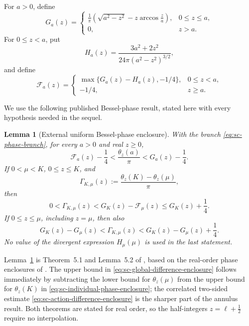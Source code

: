 \documentclass[11pt]{article}
\numberwithin{equation}{section}
\newtheorem{lemma}[theorem]{Lemma}
\theoremstyle{definition}
\theoremstyle{remark}
\begin{document}
For \(a>0\), define
\begin{equation}
  G_a(z)=
  \begin{cases}
  \displaystyle\frac1\pi\left(\sqrt{a^2-z^2}
  -z\arccos\frac za\right),&0\le z\le a,\\[1mm]
  0,&z>a.
  \end{cases}
  \label{eq:sc-model-action}
\end{equation}
For \(0\le z<a\), put
\[
  H_a(z)=\frac{3a^2+2z^2}{24\pi(a^2-z^2)^{3/2}},
\]
and define
\begin{equation}
  \mathcal F_a(z)=
  \begin{cases}
  \max\{G_a(z)-H_a(z),-1/4\},&0\le z<a,\\
  -1/4,&z\ge a.
  \end{cases}
  \label{eq:sc-auxiliary-F}
\end{equation}

We use the following published Bessel-phase result, stated here with every
hypothesis needed in the sequel.

\begin{lemma}[External uniform Bessel-phase enclosure]
\label{lem:sc-external-phase}
With the branch \eqref{eq:sc-phase-branch}, for every \(a>0\) and real
\(z\ge0\),
\begin{equation}
  \mathcal F_a(z)-\frac14
  <\frac{\theta_z(a)}\pi
  <G_a(z)-\frac14.
  \label{eq:sc-individual-phase-enclosure}
\end{equation}
If \(0<\mu<K\), \(0\le z\le K\), and
\[
  \Gamma_{K,\mu}(z)
  :=\frac{\theta_z(K)-\theta_z(\mu)}\pi,
\]
then
\begin{equation}
  0<\Gamma_{K,\mu}(z)
  <G_K(z)-\mathcal F_\mu(z)
  \le G_K(z)+\frac14.
  \label{eq:sc-global-difference-enclosure}
\end{equation}
If \(0\le z\le\mu\), including \(z=\mu\), then also
\begin{equation}
  G_K(z)-G_\mu(z)
  <\Gamma_{K,\mu}(z)
  <G_K(z)-G_\mu(z)+\frac14.
  \label{eq:sc-action-difference-enclosure}
\end{equation}
No value of the divergent expression \(H_\mu(\mu)\) is used in the last
statement.
\end{lemma}

Lemma~\ref{lem:sc-external-phase} is Theorem~5.1 and Lemma~5.2 of
\cite{FLPSannuli}, based on the real-order phase enclosures of
\cite{FLPSphase}.  The upper bound in
\eqref{eq:sc-global-difference-enclosure} follows immediately by subtracting
the lower bound for \(\theta_z(\mu)\) from the upper bound for
\(\theta_z(K)\) in \eqref{eq:sc-individual-phase-enclosure}; the correlated
two-sided estimate \eqref{eq:sc-action-difference-enclosure} is the sharper
part of the annulus result.  Both theorems are stated for real order, so the
half-integers \(z=\ell+\tfrac12\) require no interpolation.
\end{document}
